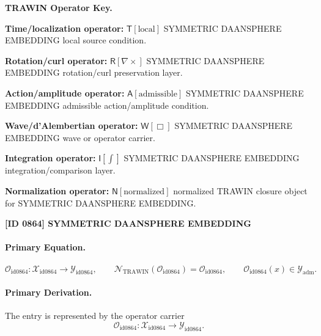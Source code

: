 \par\vspace{0.45\baselineskip}
\noindent\begin{minipage}[t]{\linewidth}
\begingroup
\small
\raggedright
\textbf{TRAWIN Operator Key.}\par
\noindent\textbf{Time/localization operator:} $\mathsf{T}\!\left[\mathrm{local}\right]$ SYMMETRIC DAANSPHERE EMBEDDING local source condition.\par
\noindent\textbf{Rotation/curl operator:} $\mathsf{R}\!\left[\nabla\times\right]$ SYMMETRIC DAANSPHERE EMBEDDING rotation/curl preservation layer.\par
\noindent\textbf{Action/amplitude operator:} $\mathsf{A}\!\left[\mathrm{admissible}\right]$ SYMMETRIC DAANSPHERE EMBEDDING admissible action/amplitude condition.\par
\noindent\textbf{Wave/d'Alembertian operator:} $\mathsf{W}\!\left[\Box\right]$ SYMMETRIC DAANSPHERE EMBEDDING wave or operator carrier.\par
\noindent\textbf{Integration operator:} $\mathsf{I}\!\left[\int\right]$ SYMMETRIC DAANSPHERE EMBEDDING integration/comparison layer.\par
\noindent\textbf{Normalization operator:} $\mathsf{N}\!\left[\mathrm{normalized}\right]$ normalized TRAWIN closure object for SYMMETRIC DAANSPHERE EMBEDDING.\par
\endgroup
\end{minipage}

\clearpage
\noindent\textbf{[ID 0864] SYMMETRIC DAANSPHERE EMBEDDING}\par
\vspace{0.35em}
\paragraph{Primary Equation.}
\[
\mathcal{O}_{\mathrm{id0864}}:\mathcal{X}_{\mathrm{id0864}}\longrightarrow \mathcal{Y}_{\mathrm{id0864}},\qquad
\mathcal{N}_{\mathrm{TRAWIN}}(\mathcal{O}_{\mathrm{id0864}})=\mathcal{O}_{\mathrm{id0864}},\qquad
\mathcal{O}_{\mathrm{id0864}}(x)\in\mathcal{Y}_{\mathrm{adm}}.
\]

\paragraph{Primary Derivation.} The entry is represented by the operator carrier\[
\mathcal{O}_{\mathrm{id0864}}:\mathcal{X}_{\mathrm{id0864}}\longrightarrow \mathcal{Y}_{\mathrm{id0864}}.
\]

